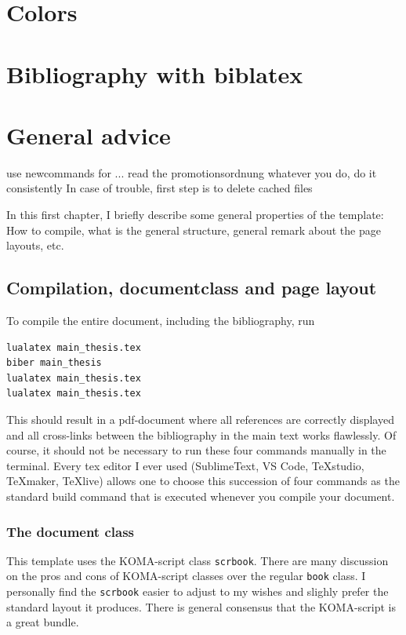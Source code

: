 \chapter{Colors}
\chapter{Bibliography with biblatex}\label{chap:biblatex}

\chapter{General advice}
use newcommands for ...
read the promotionsordnung
whatever you do, do it consistently
In case of trouble, first step is to delete cached files


In this first chapter, I briefly describe some general properties of the template: How to compile, what is the general structure, general remark about the page layouts, etc.

\section{Compilation, documentclass and page layout}

To compile the entire document, including the bibliography, run
\begin{lstlisting}
lualatex main_thesis.tex
biber main_thesis
lualatex main_thesis.tex
lualatex main_thesis.tex
\end{lstlisting}

This should result in a pdf-document where all references are correctly displayed and all cross-links between the bibliography in the main text works flawlessly.
Of course, it should not be necessary to run these four commands manually in the terminal. Every tex editor I ever used (SublimeText, VS Code, TeXstudio, TeXmaker, TeXlive) allows one to choose 
this succession of four commands as the standard build command that is executed whenever you compile your document.


\subsection{The document class}
This template uses the KOMA-script class \verb|scrbook|. There are many discussion on the pros and cons of KOMA-script classes over the regular \verb|book| class. I personally find the \verb|scrbook| easier to adjust to my wishes and slighly prefer the standard layout it produces. There is general consensus that the KOMA-script is a great bundle.


